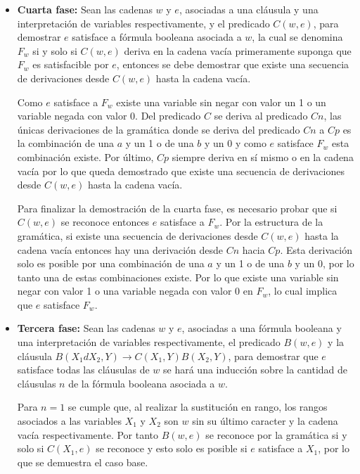 \documentclass[12pt]{article}
\begin{document}
\begin{itemize}
    \item \textbf{Cuarta fase:} Sean las cadenas $w$ y $e$, asociadas a una cláusula y una interpretación de variables respectivamente, y el predicado $C(w,e)$, para demostrar $e$
          satisface a fórmula booleana asociada a $w$, la cual se denomina $F_w$ si y solo si $C(w,e)$ deriva
          en la cadena vacía primeramente suponga que $F_w$ es satisfacible por $e$, entonces se debe demostrar que
          existe una secuencia de derivaciones desde $C(w,e)$ hasta la cadena vacía.

          Como $e$ satisface a $F_w$ existe una variable sin negar con valor un 1 o un variable negada con valor 0.
          Del predicado $C$ se deriva al predicado $Cn$, las únicas derivaciones de la gramática donde se deriva del
          predicado $Cn$ a $Cp$ es la combinación de una $a$ y un 1 o de una $b$ y un 0 y como $e$ satisface $F_w$ esta combinación existe.
          Por último, $Cp$ siempre deriva en sí mismo o en la cadena vacía por lo que queda demostrado que existe una secuencia de derivaciones desde $C(w,e)$ hasta la cadena vacía.

          Para finalizar la demostración de la cuarta fase, es necesario probar que si $C(w,e)$ se reconoce entonces $e$ satisface a $F_w$. Por la estructura de la gramática,
          si existe una secuencia de derivaciones desde $C(w,e)$ hasta la cadena vacía entonces hay una derivación
          desde $Cn$ hacia $Cp$. Esta derivación solo es posible por una combinación de una $a$ y un 1 o de una $b$ y
          un 0, por lo tanto una de estas combinaciones existe. Por lo que existe una variable sin negar con valor 1 o
          una variable negada con valor 0 en $F_w$, lo cual implica que $e$ satisface $F_w$.

    \item \textbf{Tercera fase:} Sean las cadenas $w$ y $e$, asociadas a una fórmula booleana y una interpretación de variables respectivamente, el predicado $B(w,e)$ y la cláusula $B(X_1dX_2,Y)\to C(X_1,Y) B(X_2,Y)$,
          para demostrar que $e$ satisface todas las cláusulas de $w$ se hará una inducción sobre la cantidad de cláusulas $n$ de la fórmula booleana asociada a $w$.

          Para $n=1$ se cumple que, al realizar la sustitución en rango, los rangos asociados a las variables $X_1$ y $X_2$ son $w$ sin su último caracter y la cadena
          vacía respectivamente. Por tanto $B(w,e)$ se reconoce por la gramática si y solo si $C(X_1,e)$ se reconoce y
          esto solo es posible si $e$ satisface a $X_1$, por lo que se demuestra el caso base.


\end{itemize}
\end{document}
